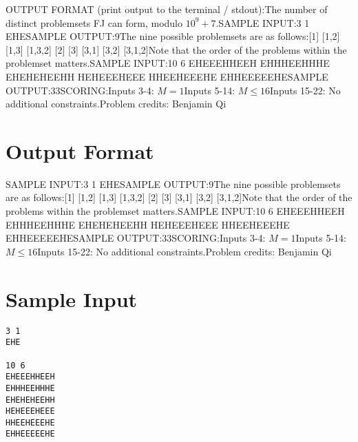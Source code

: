 \documentclass[12pt]{article}
\begin{document}
OUTPUT FORMAT (print output to the terminal / stdout):The number of distinct problemsets FJ can form, modulo $10^9+7$.SAMPLE INPUT:3 1
EHESAMPLE OUTPUT:9The nine possible problemsets are as follows:[1]
[1,2]
[1,3]
[1,3,2]
[2]
[3]
[3,1]
[3,2]
[3,1,2]Note that the order of the problems within the problemset matters.SAMPLE INPUT:10 6
EHEEEHHEEH
EHHHEEHHHE
EHEHEHEEHH
HEHEEEHEEE
HHEEHEEEHE
EHHEEEEEHESAMPLE OUTPUT:33SCORING:Inputs 3-4: $M=1$Inputs 5-14: $M\le 16$Inputs 15-22: No additional constraints.Problem credits: Benjamin Qi

\section*{Output Format}
SAMPLE INPUT:3 1
EHESAMPLE OUTPUT:9The nine possible problemsets are as follows:[1]
[1,2]
[1,3]
[1,3,2]
[2]
[3]
[3,1]
[3,2]
[3,1,2]Note that the order of the problems within the problemset matters.SAMPLE INPUT:10 6
EHEEEHHEEH
EHHHEEHHHE
EHEHEHEEHH
HEHEEEHEEE
HHEEHEEEHE
EHHEEEEEHESAMPLE OUTPUT:33SCORING:Inputs 3-4: $M=1$Inputs 5-14: $M\le 16$Inputs 15-22: No additional constraints.Problem credits: Benjamin Qi

\section*{Sample Input}
\begin{verbatim}
3 1
EHE

10 6
EHEEEHHEEH
EHHHEEHHHE
EHEHEHEEHH
HEHEEEHEEE
HHEEHEEEHE
EHHEEEEEHE
\end{verbatim}
\end{document}
